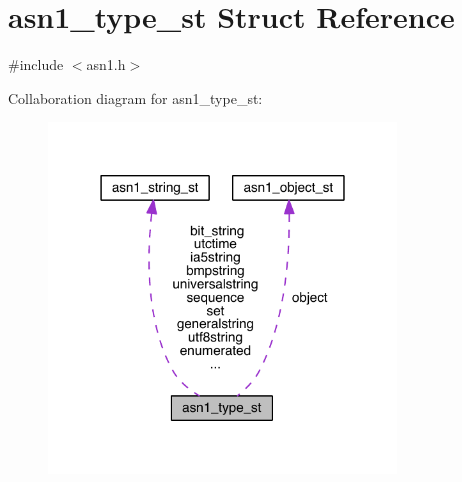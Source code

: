 \hypertarget{structasn1__type__st}{}\section{asn1\+\_\+type\+\_\+st Struct Reference}
\label{structasn1__type__st}


{\ttfamily \#include $<$asn1.\+h$>$}



Collaboration diagram for asn1\+\_\+type\+\_\+st\+:\nopagebreak
\begin{figure}[H]
\begin{center}
\leavevmode
\includegraphics[width=262pt]{structasn1__type__st__coll__graph}
\end{center}
\end{figure}
